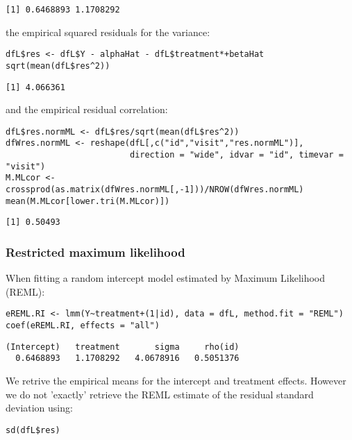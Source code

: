 \documentclass[12pt]{article}
\begin{document}
\begin{verbatim}
[1] 0.6468893 1.1708292
\end{verbatim}


the empirical squared residuals for the variance:
\lstset{language=r,label= ,caption= ,captionpos=b,numbers=none}
\begin{lstlisting}
dfL$res <- dfL$Y - alphaHat - dfL$treatment*+betaHat
sqrt(mean(dfL$res^2))
\end{lstlisting}

\begin{verbatim}
[1] 4.066361
\end{verbatim}


\clearpage

and the empirical residual correlation:
\lstset{language=r,label= ,caption= ,captionpos=b,numbers=none}
\begin{lstlisting}
dfL$res.normML <- dfL$res/sqrt(mean(dfL$res^2))
dfWres.normML <- reshape(dfL[,c("id","visit","res.normML")],
                         direction = "wide", idvar = "id", timevar = "visit")
M.MLcor <- crossprod(as.matrix(dfWres.normML[,-1]))/NROW(dfWres.normML)
mean(M.MLcor[lower.tri(M.MLcor)])
\end{lstlisting}

\begin{verbatim}
[1] 0.50493
\end{verbatim}

\subsubsection{Restricted maximum likelihood}
\label{sec:orga13c32a}

When fitting a random intercept model estimated by Maximum Likelihood
(REML):
\lstset{language=r,label= ,caption= ,captionpos=b,numbers=none}
\begin{lstlisting}
eREML.RI <- lmm(Y~treatment+(1|id), data = dfL, method.fit = "REML")
coef(eREML.RI, effects = "all")
\end{lstlisting}

\begin{verbatim}
(Intercept)   treatment       sigma     rho(id) 
  0.6468893   1.1708292   4.0678916   0.5051376
\end{verbatim}


We retrive the empirical means for the intercept and treatment
effects.  However we do not 'exactly' retrieve the REML estimate of the residual
standard deviation using:
\lstset{language=r,label= ,caption= ,captionpos=b,numbers=none}
\begin{lstlisting}
sd(dfL$res)
\end{lstlisting}
\end{document}
